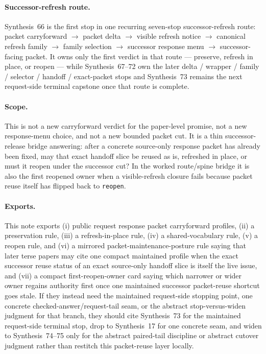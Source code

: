 \documentclass[11pt]{article}
\begin{document}
\paragraph{Successor-refresh route.}
Synthesis~66 is the first stop in one recurring seven-stop successor-refresh route: packet carryforward $\rightarrow$ packet delta $\rightarrow$ visible refresh notice $\rightarrow$ canonical refresh family $\rightarrow$ family selection $\rightarrow$ successor response menu $\rightarrow$ successor-facing packet.
It owns only the first verdict in that route --- preserve, refresh in place, or reopen --- while Synthesis~67--72 own the later delta / wrapper / family / selector / handoff / exact-packet stops and Synthesis~73 remains the next request-side terminal capstone once that route is complete.

\paragraph{Scope.}
This is not a new carryforward verdict for the paper-level promise, not a new response-menu choice, and not a new bounded packet cut.
It is a thin successor-release bridge answering: after a concrete source-only response packet has already been fixed, may that exact handoff slice be reused as is, refreshed in place, or must it reopen under the successor cut? In the worked route/spine bridge it is also the first reopened owner when a visible-refresh closure fails because packet reuse itself has flipped back to \texttt{reopen}.

\paragraph{Exports.}
This note exports (i) public request response packet carryforward profiles, (ii) a preservation rule, (iii) a refresh-in-place rule, (iv) a shared-vocabulary rule, (v) a reopen rule, and (vi) a mirrored packet-maintenance-posture rule saying that later terse papers may cite one compact maintained profile when the exact successor reuse status of an exact source-only handoff slice is itself the live issue, and (vii) a compact first-reopen-owner card saying which narrower or wider owner regains authority first once one maintained successor packet-reuse shortcut goes stale. If they instead need the maintained request-side stopping point, one concrete checked-answer/request-tail seam, or the abstract stop-versus-widen judgment for that branch, they should cite Synthesis~73 for the maintained request-side terminal stop, drop to Synthesis~17 for one concrete seam, and widen to Synthesis~74--75 only for the abstract paired-tail discipline or abstract cutover judgment rather than restitch this packet-reuse layer locally.
\end{document}

